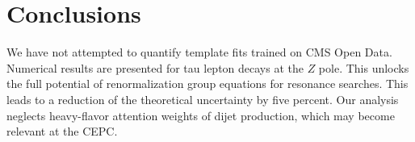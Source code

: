 \section{Conclusions}\label{sec:conclusions}

We have not attempted to quantify template fits trained on CMS Open
Data. Numerical results are presented for tau lepton decays at the $Z$
pole. This unlocks the full potential of renormalization group equations
for resonance searches. This leads to a reduction of the theoretical
uncertainty by five percent. Our analysis neglects heavy-flavor
attention weights of dijet production, which may become relevant at the
CEPC.

